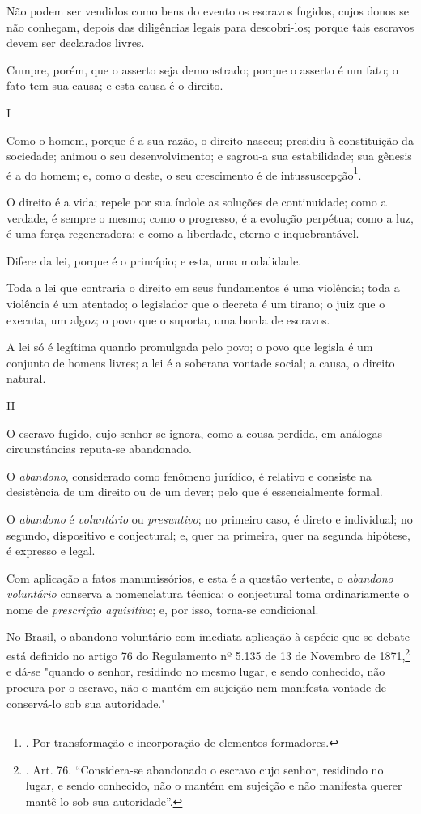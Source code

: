 Não podem ser vendidos como bens do evento os escravos fugidos, cujos
donos se não conheçam, depois das diligências legais para descobri-los;
porque tais escravos devem ser declarados livres.

Cumpre, porém, que o asserto seja demonstrado; porque o asserto é um
fato; o fato tem sua causa; e esta causa é o direito.

I

Como o homem, porque é a sua razão, o direito nasceu; presidiu à
constituição da sociedade; animou o seu desenvolvimento; e sagrou-a sua
estabilidade; sua gênesis é a do homem; e, como o deste, o seu
crescimento é de intussuscepção\footnote{. Por transformação e
  incorporação de elementos formadores.}.

O direito é a vida; repele por sua índole as soluções de continuidade;
como a verdade, é sempre o mesmo; como o progresso, é a evolução
perpétua; como a luz, é uma força regeneradora; e como a liberdade,
eterno e inquebrantável.

Difere da lei, porque é o princípio; e esta, uma modalidade.

Toda a lei que contraria o direito em seus fundamentos é uma violência;
toda a violência é um atentado; o legislador que o decreta é um tirano;
o juiz que o executa, um algoz; o povo que o suporta, uma horda de
escravos.

A lei só é legítima quando promulgada pelo povo; o povo que legisla é um
conjunto de homens livres; a lei é a soberana vontade social; a causa, o
direito natural.

II

O escravo fugido, cujo senhor se ignora, como a cousa perdida, em
análogas circunstâncias reputa-se abandonado.

O \emph{abandono}, considerado como fenômeno jurídico, é relativo e
consiste na desistência de um direito ou de um dever; pelo que é
essencialmente formal.

O \emph{abandono} é \emph{voluntário} ou \emph{presuntivo}; no primeiro
caso, é direto e individual; no segundo, dispositivo e conjectural; e,
quer na primeira, quer na segunda hipótese, é expresso e legal.

Com aplicação a fatos manumissórios, e esta é a questão vertente, o
\emph{abandono voluntário} conserva a nomenclatura técnica; o
conjectural toma ordinariamente o nome de \emph{prescrição aquisitiva};
e, por isso, torna-se condicional.

No Brasil, o abandono voluntário com imediata aplicação à espécie que se
debate está definido no artigo 76 do Regulamento nº 5.135 de 13 de
Novembro de 1871,\footnote{. Art. 76. ``Considera-se abandonado o
  escravo cujo senhor, residindo no lugar, e sendo conhecido, não o
  mantém em sujeição e não manifesta querer mantê-lo sob sua
  autoridade''.} e dá-se "quando o senhor, residindo no mesmo lugar, e
sendo conhecido, não procura por o escravo, não o mantém em sujeição nem
manifesta vontade de conservá-lo sob sua autoridade."

